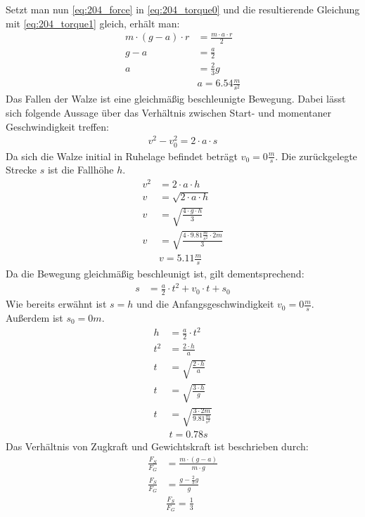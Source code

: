 \documentclass{article}
\begin{document}
	Setzt man nun \eqref{eq:204_force} in \eqref{eq:204_torque0} und die resultierende Gleichung mit \eqref{eq:204_torque1} gleich, erhält man:
	\begin{align*}
		m\cdot(g-a)\cdot r&=\frac{m\cdot a\cdot r}{2}\\
		g-a&=\frac{a}{2}\\
		a&=\frac{2}{3}g\\
		&\boxed{a=6.54\frac{m}{s^2}}	\tag{a}\label{eq:204_a}
	\end{align*}
	Das Fallen der Walze ist eine gleichmäßig beschleunigte Bewegung. Dabei lässt sich folgende Aussage über das Verhältnis zwischen Start- und momentaner Geschwindigkeit treffen:
	\begin{align*}
		v^2-v_0^2=2\cdot a\cdot s
	\end{align*}
	Da sich die Walze initial in Ruhelage befindet beträgt $v_0=0\frac{m}{s}$. Die zurückgelegte Strecke $s$ ist die Fallhöhe $h$.
	\begin{align*}
		v^2&=2\cdot a\cdot h\\
		v&=\sqrt{2\cdot a\cdot h}\\
		v&=\sqrt{\frac{4\cdot g \cdot h}{3}}\\
		v&=\sqrt{\frac{4\cdot 9.81\frac{m}{s^2} \cdot 2m}{3}}\\
		&\boxed{v=5.11\frac{m}{s}}	\tag{b}	\label{eq:204_b}
	\end{align*}
	Da die Bewegung gleichmäßig beschleunigt ist, gilt dementsprechend:
	\begin{align*}
		s&=\frac{a}{2}\cdot t^2+v_0\cdot t+s_0
	\end{align*}
	\newpage
	Wie bereits erwähnt ist $s=h$ und die Anfangsgeschwindigkeit $v_0=0\frac{m}{s}$. Außerdem ist $s_0=0m$.
	\begin{align*}
		h&=\frac{a}{2}\cdot t^2\\
		t^2&=\frac{2\cdot h}{a}\\
		t&=\sqrt{\frac{2\cdot h}{a}}\\
		t&=\sqrt{\frac{3\cdot h}{g}}\\
		t&=\sqrt{\frac{3\cdot 2m}{9.81\frac{m}{s^2}}}\\
		&\boxed{t=0.78s}	\tag{c}	\label{eq:204_c}
	\end{align*}
	Das Verhältnis von Zugkraft und Gewichtskraft ist beschrieben durch:
	\begin{align*}
		\frac{F_S}{F_G}&=\frac{m\cdot(g-a)}{m\cdot g}\\
		\frac{F_S}{F_G}&=\frac{g-\frac{2}{3}g}{g}\\
		&\boxed{\frac{F_S}{F_G}=\frac{1}{3}}	\tag{d}	\label{eq:204_d}
	\end{align*}
	\newpage
	
\end{document}
